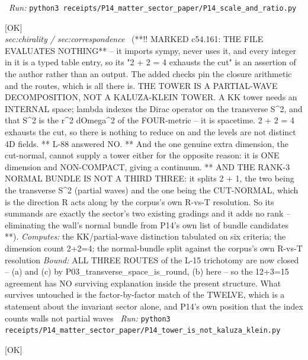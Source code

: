 \begin{description}
\ \emph{Run:} \texttt{python3 receipts/P14\_matter\_sector\_paper/P14\_scale\_and\_ratio.py}
\item[\rcptlabel{P14_tower_is_not_kaluza_klein}{P14R47}\textbf{P14R47}\quad\texttt{P14\_tower\_is\_not\_kaluza\_klein}]\hfill\textsf{[OK]}\\
\textit{sec:chirality / sec:correspondence} \ (**!! MARKED c54.161: THE FILE EVALUATES NOTHING** -- it imports sympy, never uses it, and every integer in it is a typed table entry, so its "2 + 2 = 4 exhausts the cut" is an assertion of the author rather than an output. The added checks pin the closure arithmetic and the routes, which is all there is. THE TOWER IS A PARTIAL-WAVE DECOMPOSITION, NOT A KALUZA-KLEIN TOWER. A KK tower needs an INTERNAL space; lambda indexes the Dirac operator on the transverse S\textasciicircum{}2, and that S\textasciicircum{}2 is the r\textasciicircum{}2 dOmega\textasciicircum{}2 of the FOUR-metric -- it is spacetime. 2 + 2 = 4 exhausts the cut, so there is nothing to reduce on and the levels are not distinct 4D fields. ** L-88 answered NO. ** And the one genuine extra dimension, the cut-normal, cannot supply a tower either for the opposite reason: it is ONE dimension and NON-COMPACT, giving a continuum. ** AND THE RANK-3 NORMAL BUNDLE IS NOT A THIRD THREE: it splits 2 + 1, the two being the transverse S\textasciicircum{}2 (partial waves) and the one being the CUT-NORMAL, which is the direction R acts along by the corpus's own R-vs-T resolution. So its summands are exactly the sector's two existing gradings and it adds no rank -- eliminating the wall's normal bundle from P14's own list of bundle candidates **). 
\emph{Computes:} the KK/partial-wave distinction tabulated on six criteria; the dimension count 2+2=4; the normal-bundle split against the corpus's own R-vs-T resolution
 \emph{Bound:} ALL THREE ROUTES of the L-15 trichotomy are now closed -- (a) and (c) by P03\_transverse\_space\_is\_round, (b) here -- so the 12+3=15 agreement has NO surviving explanation inside the present structure. What survives untouched is the factor-by-factor match of the TWELVE, which is a statement about the invariant sector alone, and P14's own position that the index counts walls not partial waves
\ \emph{Run:} \texttt{python3 receipts/P14\_matter\_sector\_paper/P14\_tower\_is\_not\_kaluza\_klein.py}
\item[\rcptlabel{P14_lambda_spectrum}{P14R48}\textbf{P14R48}\quad\texttt{P14\_lambda\_spectrum}]\hfill\textsf{[OK]}\\

\end{description}
